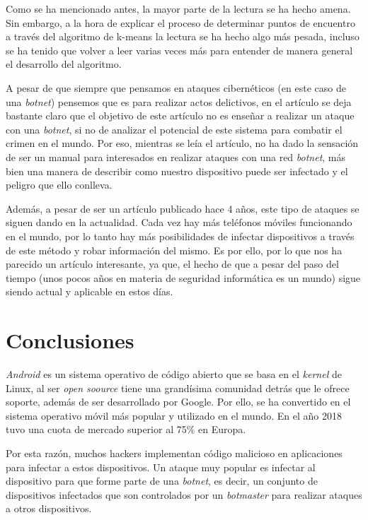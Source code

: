 \documentclass[a4paper,11pt]{report}
\begin{document}
Como se ha mencionado antes, la mayor parte de la lectura se ha hecho amena. Sin embargo, a la hora de explicar el proceso de determinar puntos de encuentro a través del algoritmo de k-means la lectura se ha hecho algo más pesada, incluso se ha tenido que volver a leer varias veces más para entender de manera general el desarrollo del algoritmo. 

A pesar de que siempre que pensamos en ataques cibernéticos (en este caso de una \emph{botnet}) pensemos que es para realizar actos delictivos, en el artículo se deja bastante claro que el objetivo de este artículo no es enseñar a realizar un ataque con una \emph{botnet}, si no de analizar el potencial de este sistema para combatir el crimen en el mundo. Por eso, mientras se leía el artículo, no ha dado la sensación de ser un manual para interesados en realizar ataques con una red \emph{botnet}, más bien una manera de describir como nuestro dispositivo puede ser infectado y el peligro que ello conlleva.

Además, a pesar de ser un artículo publicado hace 4 años, este tipo de ataques se siguen dando en la actualidad. Cada vez hay más teléfonos móviles funcionando en el mundo, por lo tanto hay más posibilidades de infectar dispositivos a través de este método y robar información del mismo. Es por ello, por lo que nos ha parecido un artículo interesante, ya que, el hecho de que a pesar del paso del tiempo (unos pocos años en materia de seguridad informática es un mundo) sigue siendo actual y aplicable en estos días.


\chapter{Conclusiones} \label{conclusiones}

 \emph{Android} es un sistema operativo de código abierto que se basa en el \emph{kernel} de Linux, al ser \emph{open soource} tiene una grandísima comunidad detrás que le ofrece soporte, además de ser desarrollado por Google. Por ello, se ha convertido en el sistema operativo móvil más popular y utilizado en el mundo. En el año 2018 tuvo una cuota de mercado superior al 75\%{} en Europa.
 
Por esta razón, muchos hackers implementan código malicioso en aplicaciones para infectar a estos dispositivos. Un ataque muy popular es infectar al dispositivo para que forme parte de una \emph{botnet}, es decir, un conjunto de dispositivos infectados que son controlados por un \emph{botmaster} para realizar ataques a otros dispositivos.
\end{document}
